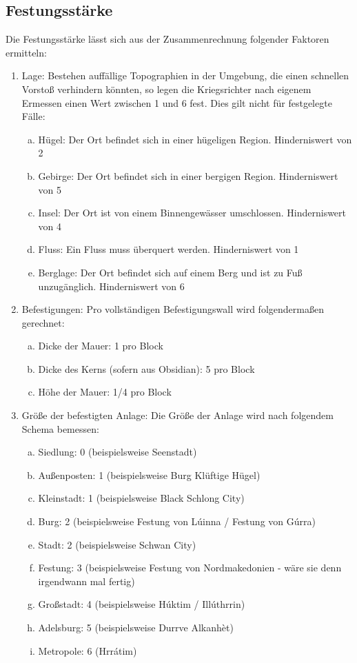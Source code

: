 \documentclass{article}
\begin{document}
\subsection{Festungsstärke}\label{festung}
Die Festungsstärke lässt sich aus der Zusammenrechnung folgender Faktoren ermitteln:
\begin{enumerate}[1.]
	\item Lage: Bestehen auffällige Topographien in der Umgebung, die einen schnellen Vorstoß verhindern könnten, so legen die Kriegsrichter nach eigenem Ermessen einen Wert zwischen 1 und 6 fest. Dies gilt nicht für festgelegte Fälle:
	\begin{enumerate}[a.]
		\item Hügel: Der Ort befindet sich in einer hügeligen Region. Hinderniswert von 2
		\item Gebirge: Der Ort befindet sich in einer bergigen Region. Hinderniswert von 5
		\item Insel: Der Ort ist von einem Binnengewässer umschlossen. Hinderniswert von 4
		\item Fluss: Ein Fluss muss überquert werden. Hinderniswert von 1
		\item Berglage: Der Ort befindet sich auf einem Berg und ist zu Fuß unzugänglich. Hinderniswert von 6
	\end{enumerate}
	\item Befestigungen: Pro vollständigen Befestigungswall wird folgendermaßen gerechnet:
	\begin{enumerate}[a.]
		\item Dicke der Mauer: 1 pro Block
		\item Dicke des Kerns (sofern aus Obsidian): 5 pro Block
		\item Höhe der Mauer: 1/4 pro Block
	\end{enumerate}
	\item Größe der befestigten Anlage: Die Größe der Anlage wird nach folgendem Schema bemessen:
	\begin{enumerate}[a.]
		\item Siedlung: 0 (beispielsweise Seenstadt)
		\item Außenposten: 1 (beispielsweise Burg Klüftige Hügel)
		\item Kleinstadt: 1 (beispielsweise Black Schlong City)
		\item Burg: 2 (beispielsweise Festung von Lúinna / Festung von Gúrra)
		\item Stadt: 2 (beispielsweise Schwan City)
		\item Festung: 3 (beispielsweise Festung von Nordmakedonien - wäre sie denn irgendwann mal fertig)
		\item Großstadt: 4 (beispielsweise Húktim / Illúthrrin)
		\item Adelsburg: 5 (beispielsweise Durrve Alkanhèt)
		\item Metropole: 6 (Hrrátim)
	\end{enumerate}
\end{enumerate}
\end{document}
